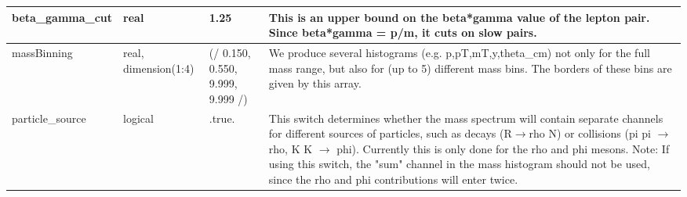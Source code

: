 \documentclass{article}
\begin{document}
\begin{longtable}{llll}
\midrule
beta\_gamma\_cut & \begin{minipage}[t]{2cm}real\end{minipage} & \begin{minipage}[t]{2cm}1.25\end{minipage} & \begin{minipage}[t]{12cm}This is an upper bound on the beta*gamma value of the lepton pair. Since beta*gamma = p/m, it cuts on slow pairs.\end{minipage}\\*
\midrule
massBinning & \begin{minipage}[t]{2cm}real, dimension(1:4)\end{minipage} & \begin{minipage}[t]{2cm}(/ 0.150, 0.550, 9.999, 9.999 /)\end{minipage} & \begin{minipage}[t]{12cm}We produce several histograms (e.g. p,pT,mT,y,theta\_cm) not only for the full mass range, but also for (up to 5) different mass bins. The borders of these bins are given by this array.\end{minipage}\\*
\midrule
particle\_source & \begin{minipage}[t]{2cm}logical\end{minipage} & \begin{minipage}[t]{2cm}.true.\end{minipage} & \begin{minipage}[t]{12cm}This switch determines whether the mass spectrum will contain separate channels for different sources of particles, such as decays (R$\rightarrow$rho N) or collisions (pi pi $\rightarrow$ rho, K K $\rightarrow$ phi). Currently this is only done for the rho and phi mesons. Note: If using this switch, the "sum" channel in the mass histogram should not be used, since the rho and phi contributions will enter twice.\end{minipage}\\*
\bottomrule
\end{longtable}
{ }



\end{document}
